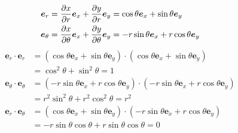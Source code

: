 \documentclass[uplatex,dvipdfmx,a4paper,11pt]{jlreq}
\newcommand{\ee}{\bm{e}}
\theoremstyle{definition}
\begin{document}
\begin{align}
  \ee_r      & = \diffp{x}{r}\ee_x + \diffp{y}{r}\ee_y = \cos\theta\ee_x + \sin\theta\ee_y              \\
  \ee_\theta & = \diffp{x}{\theta}\ee_x + \diffp{y}{\theta}\ee_y = -r\sin\theta\ee_x + r\cos\theta\ee_y
\end{align}
\begin{align}
  \ee_r\cdot\ee_r           & = (\cos\theta\ee_x + \sin\theta\ee_y)\cdot(\cos\theta\ee_x + \sin\theta\ee_y)       \\
                            & = \cos^2\theta + \sin^2\theta = 1                                                   \\
  \ee_\theta\cdot\ee_\theta & = (-r\sin\theta\ee_x + r\cos\theta\ee_y)\cdot(-r\sin\theta\ee_x + r\cos\theta\ee_y) \\
                            & = r^2\sin^2\theta + r^2\cos^2\theta = r^2                                           \\
  \ee_r\cdot\ee_\theta      & = (\cos\theta\ee_x + \sin\theta\ee_y)\cdot(-r\sin\theta\ee_x + r\cos\theta\ee_y)    \\
                            & = -r\sin\theta\cos\theta + r\sin\theta\cos\theta = 0
\end{align}
\end{document}
